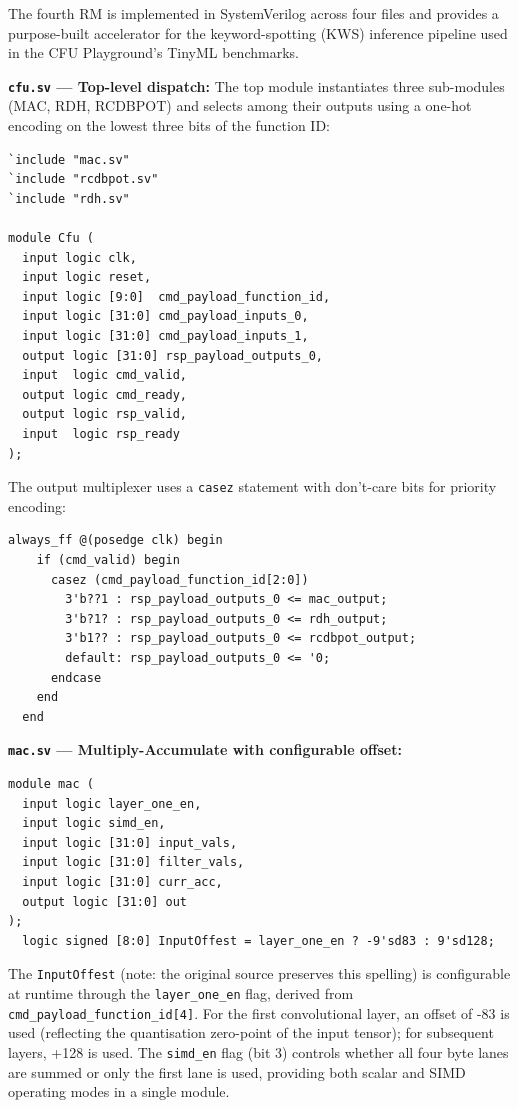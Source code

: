 The fourth RM is implemented in SystemVerilog across four files and provides a purpose-built accelerator for the keyword-spotting (KWS) inference pipeline used in the CFU Playground's TinyML benchmarks.

\textbf{\texttt{cfu.sv} — Top-level dispatch:} The top module instantiates three sub-modules (MAC, RDH, RCDBPOT) and selects among their outputs using a one-hot encoding on the lowest three bits of the function ID:

\begin{lstlisting}[style=mystyle]
`include "mac.sv"
`include "rcdbpot.sv"
`include "rdh.sv"

module Cfu (
  input logic clk,
  input logic reset,
  input logic [9:0]  cmd_payload_function_id,
  input logic [31:0] cmd_payload_inputs_0,
  input logic [31:0] cmd_payload_inputs_1,
  output logic [31:0] rsp_payload_outputs_0,
  input  logic cmd_valid,
  output logic cmd_ready,
  output logic rsp_valid,
  input  logic rsp_ready
);
\end{lstlisting}

The output multiplexer uses a \texttt{casez} statement with don't-care bits for priority encoding:

\begin{lstlisting}[style=mystyle]
  always_ff @(posedge clk) begin
    if (cmd_valid) begin
      casez (cmd_payload_function_id[2:0])
        3'b??1 : rsp_payload_outputs_0 <= mac_output;
        3'b?1? : rsp_payload_outputs_0 <= rdh_output;
        3'b1?? : rsp_payload_outputs_0 <= rcdbpot_output;
        default: rsp_payload_outputs_0 <= '0;
      endcase
    end
  end
\end{lstlisting}

\textbf{\texttt{mac.sv} — Multiply-Accumulate with configurable offset:}

\begin{lstlisting}[style=mystyle]
module mac (
  input logic layer_one_en,
  input logic simd_en,
  input logic [31:0] input_vals,
  input logic [31:0] filter_vals,
  input logic [31:0] curr_acc,
  output logic [31:0] out
);
  logic signed [8:0] InputOffest = layer_one_en ? -9'sd83 : 9'sd128;
\end{lstlisting}

The \texttt{InputOffest} (note: the original source preserves this spelling) is configurable at runtime through the \texttt{layer\_one\_en} flag, derived from \texttt{cmd\_payload\_function\_id[4]}. For the first convolutional layer, an offset of -83 is used (reflecting the quantisation zero-point of the input tensor); for subsequent layers, +128 is used. The \texttt{simd\_en} flag (bit 3) controls whether all four byte lanes are summed or only the first lane is used, providing both scalar and SIMD operating modes in a single module.

